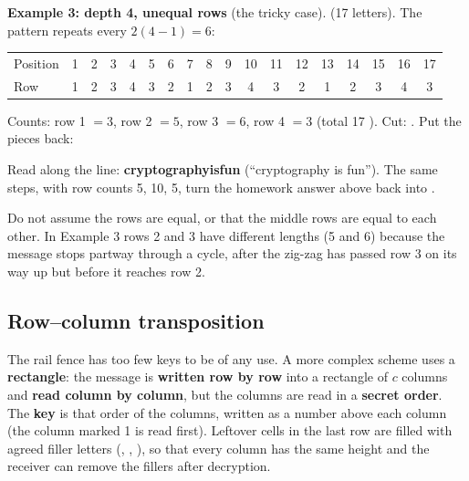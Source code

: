 \textbf{Example 3: depth 4, unequal rows} (the tricky case).  (17 letters). The pattern repeats every $2(4-1) = 6$:
\begin{center}\small\setlength{\tabcolsep}{4pt}
\begin{tabular}{@{}l*{17}{c}@{}}
\toprule
Position & 1&2&3&4&5&6&7&8&9&10&11&12&13&14&15&16&17\\
Row & 1&2&3&4&3&2&1&2&3&4&3&2&1&2&3&4&3\\
\bottomrule
\end{tabular}
\end{center}
Counts: row 1 $= 3$, row 2 $= 5$, row 3 $= 6$, row 4 $= 3$ (total 17 \checkmark). Cut: . Put the pieces back:
\begin{center}
\end{center}
Read along the line: \textbf{cryptographyisfun} (``cryptography is fun''). The same steps, with row counts 5, 10, 5, turn the homework answer above back into .

\begin{trap}
Do not assume the rows are equal, or that the middle rows are equal to each other. In Example 3 rows 2 and 3 have different lengths (5 and 6) because the message stops partway through a cycle, after the zig-zag has passed row 3 on its way up but before it reaches row 2.
\end{trap}

\subsection{Row--column transposition}
The rail fence has too few keys to be of any use. A more complex scheme uses a \textbf{rectangle}: the message is \textbf{written row by row} into a rectangle of $c$ columns and \textbf{read column by column}, but the columns are read in a \textbf{secret order}. The \textbf{key} is that order of the columns, written as a number above each column (the column marked 1 is read first). Leftover cells in the last row are filled with agreed filler letters (, , ), so that every column has the same height and the receiver can remove the fillers after decryption.

